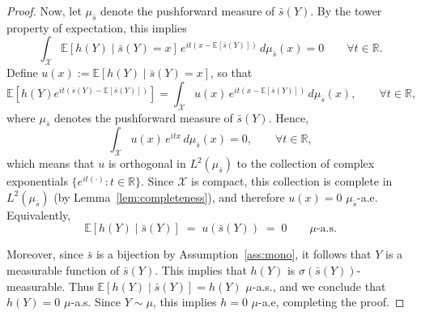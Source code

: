 \documentclass[12pt,leqno]{amsart}
\begin{document}
\begin{proof}
Now, let $\mu_{\bar{s}}$ denote the pushforward measure of $\bar{s}(Y)$. By the tower property of expectation, this implies
\[ 
\int_{\mathcal{X}} \mathbb E[h(Y)\mid \bar{s}(Y)=x]\,e^{it(x-\mathbb E[\bar{s}(Y)])}\,d\mu_{\bar{s}}(x) = 0 \qquad \forall t\in\mathbb R. 
\]
Define $u(x):=\mathbb E[h(Y)\mid \bar s(Y)=x]$, so that
\[
\mathbb E[h(Y)e^{it(\bar s(Y)-\mathbb E[\bar s(Y)])}]
= \int_{\mathcal{X}} u(x)\,e^{it(x-\mathbb E[\bar s(Y)])}\,d\mu_{\bar s}(x),
\qquad \forall t\in\mathbb R,
\]
where $\mu_{\bar s}$ denotes the pushforward measure of $\bar s(Y)$.
Hence,
\[
\int_{\mathcal{X}} u(x)\,e^{itx}\,d\mu_{\bar s}(x)=0,\qquad \forall t\in\mathbb R,
\]
which means that $u$ is orthogonal in $L^2(\mu_{\bar s})$ to the collection of
complex exponentials $\{e^{it(\cdot)}:t\in\mathbb R\}$.
Since $\mathcal{X}$ is compact, this collection is complete in $L^2(\mu_{\bar s})$
(by Lemma~\ref{lem:completeness}), and therefore $u(x)=0$ $\mu_{\bar s}$-a.e. Equivalently,
\[
\mathbb E[h(Y)\mid \bar s(Y)] \;=\; u(\bar s(Y)) \;=\; 0 \qquad \mu\text{-a.s.}
\]

Moreover, since $\bar s$ is a bijection by Assumption~\ref{ass:mono}, it follows that $Y$ is a
measurable function of $\bar s(Y)$. This implies that $h(Y)$ is $\sigma(\bar s(Y))$-measurable.
Thus $\mathbb E[h(Y)\mid \bar s(Y)] = h(Y)$ $\mu$-a.s., and we conclude that
$h(Y)=0$ $\mu$-a.s. Since $Y\sim \mu$, this implies $h=0$ $\mu$-a.e, completing the proof.
\end{proof}
\end{document}
